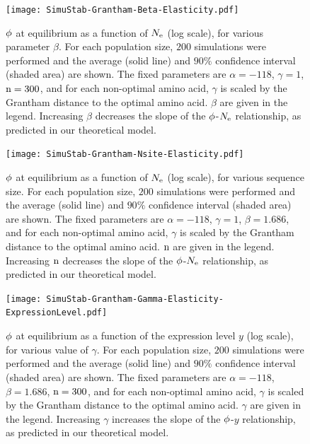 \begin{figure}[H]
	\centering
	\texttt{[image: SimuStab-Grantham-Beta-Elasticity.pdf]}
	\caption[Effect of $\beta$ on the susceptibility]{
	$\phi$ at equilibrium as a function of $N_{\mathrm{e}}$ (log scale), for various parameter $\beta$.
	For each population size, $200$ simulations were performed and the average (solid line) and $90\%$ confidence interval (shaded area) are shown.
	The fixed parameters are $\alpha=-118$, $\gamma=1$, $\text{n}=300$, and for each non-optimal amino acid, $\gamma$ is scaled by the Grantham distance to the optimal amino acid. $\beta$ are given in the legend.
	Increasing $\beta$ decreases the slope of the $\phi$-$N_{\mathrm{e}}$ relationship, as predicted in our theoretical model.
	}
\end{figure}

\begin{figure}[H]
	\centering
	\texttt{[image: SimuStab-Grantham-Nsite-Elasticity.pdf]}
	\caption[Effect of sequence size on the susceptibility]{
	$\phi$ at equilibrium as a function of $N_{\mathrm{e}}$ (log scale), for various sequence size.
	For each population size, $200$ simulations were performed and the average (solid line) and $90\%$ confidence interval (shaded area) are shown.
	The fixed parameters are $\alpha=-118$, $\gamma=1$, $\beta=1.686$, and for each non-optimal amino acid, $\gamma$ is scaled by the Grantham distance to the optimal amino acid. $\text{n}$ are given in the legend.
	Increasing $\text{n}$ decreases the slope of the $\phi$-$N_{\mathrm{e}}$ relationship, as predicted in our theoretical model.
	}
\end{figure}

\begin{figure}[H]
	\centering
	\texttt{[image: SimuStab-Grantham-Gamma-Elasticity-ExpressionLevel.pdf]}
	\caption[Effect of $\gamma$ on the susceptibility with regards to expression level]{
	$\phi$ at equilibrium as a function of the expression level $y$ (log scale), for various value of $\gamma$.
	For each population size, $200$ simulations were performed and the average (solid line) and $90\%$ confidence interval (shaded area) are shown.
	The fixed parameters are $\alpha=-118$, $\beta=1.686$, $\text{n}=300$, and for each non-optimal amino acid, $\gamma$ is scaled by the Grantham distance to the optimal amino acid. $\gamma$ are given in the legend.
	Increasing $\gamma$ increases the slope of the $\phi$-$y$ relationship, as predicted in our theoretical model.
	}
\end{figure}

